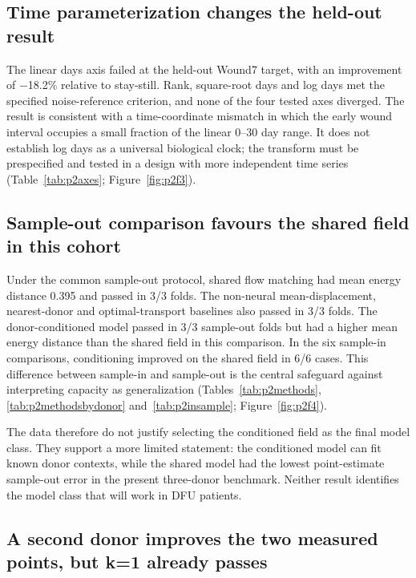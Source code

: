 \subsection{Time parameterization changes the held-out result}

The linear days axis failed at the held-out Wound7 target, with an improvement of −18.2\% relative to stay-still. Rank, square-root days and log days met the specified noise-reference criterion, and none of the four tested axes diverged. The result is consistent with a time-coordinate mismatch in which the early wound interval occupies a small fraction of the linear 0--30 day range. It does not establish log days as a universal biological clock; the transform must be prespecified and tested in a design with more independent time series (Table~\ref{tab:p2axes}; Figure~\ref{fig:p2f3}\label{call:p2f3}).





\subsection{Sample-out comparison favours the shared field in this cohort}

Under the common sample-out protocol, shared flow matching had mean energy distance 0.395 and passed in 3/3 folds. The non-neural mean-displacement, nearest-donor and optimal-transport baselines also passed in 3/3 folds. The donor-conditioned model passed in 3/3 sample-out folds but had a higher mean energy distance than the shared field in this comparison. In the six sample-in comparisons, conditioning improved on the shared field in 6/6 cases. This difference between sample-in and sample-out is the central safeguard against interpreting capacity as generalization (Tables~\ref{tab:p2methods}, \ref{tab:p2methodsbydonor} and~\ref{tab:p2insample}; Figure~\ref{fig:p2f4}\label{call:p2f4}).



The data therefore do not justify selecting the conditioned field as the final model class. They support a more limited statement: the conditioned model can fit known donor contexts, while the shared model had the lowest point-estimate sample-out error in the present three-donor benchmark. Neither result identifies the model class that will work in DFU patients.

\FloatBarrier
\subsection{A second donor improves the two measured points, but k=1 already passes}

